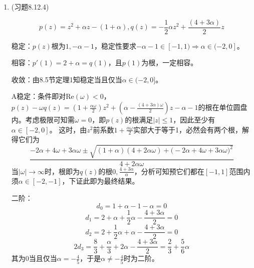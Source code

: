 \documentclass[a4paper,UTF8,fontset=windows]{ctexart}
\begin{document}
\begin{enumerate}
    \item (习题8.12.4)
    
    $$p(z)=z^2+\alpha z-(1+\alpha),q(z)=-\frac{1}{2}\alpha z^2+\frac{(4+3\alpha)}{2}z$$
    
    稳定：$p(z)$根为$1,-\alpha-1$，稳定性要求$-\alpha-1\in[-1,1)\Rightarrow\alpha\in(-2,0]$。
    
    相容：$p'(1)=2+\alpha=q(1)$，且$p(1)$为根，一定相容。
    
    收敛：由8.5节定理1知稳定当且仅当$\alpha\in(-2,0]$。
    
    A稳定：条件即对$\mathrm{Re}(\omega)<0$，$p(z)-\omega q(z)=(1+\frac{\alpha\omega}{2})z^2+(\alpha-\frac{(4+3\alpha)\omega}{2})z-\alpha-1$的根在单位圆盘内。考虑极限可知需$\omega=0$，即$p(z)$的根满足$|z|\le1$，因此至少有$\alpha\in[-2,0]$。
    这时，由$z^2$前系数$1+\frac{\alpha\omega}{2}$实部大于等于1，必然会有两个根，解得它们为
    $$\frac{-2\alpha+4\omega+3\alpha\omega\pm\sqrt{(1+\alpha)(4+2\alpha\omega)+\big(-2\alpha+4\omega+3\alpha\omega\big)^2}}{4+2\alpha\omega}$$
    当$|\omega|\to\infty$时，根即为$q(z)$的根$0,\frac{4+3\alpha}{\alpha}$，分析可知预它们都在$[-1,1]$范围内须$\alpha\in[-2,-1]$，下证此即为最终结果。
    
    二阶：
    $$d_0=1+\alpha-1-\alpha=0$$
    $$d_1=2+\alpha+\frac{1}{2}\alpha-\frac{4+3\alpha}{2}=0$$
    $$d_2=2+\frac{1}{2}\alpha+\alpha-\frac{4+3\alpha}{2}=0$$
    $$2d_3=\frac{8}{3}+\frac{\alpha}{3}+2\alpha-\frac{4+3\alpha}{2}=\frac{2}{3}+\frac{5}{6}\alpha$$
    其为0当且仅当$\alpha=-\frac{4}{5}$，于是$\alpha\ne-\frac{4}{5}$时为二阶。
\end{enumerate}
\end{document}
